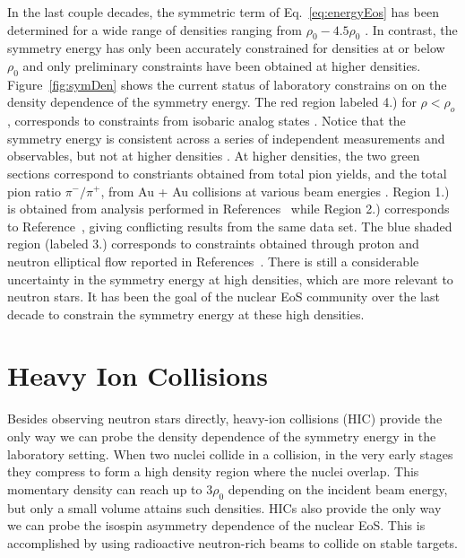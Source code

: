 In the last couple decades, the symmetric term of Eq.~\ref{eq:energyEos} has been determined for a wide range of densities ranging from $\rho_0 - 4.5\rho_0$ \cite{scienceEos}. In contrast, the symmetry energy has only been accurately constrained for densities at or below $\rho_0$ and only preliminary constraints have been obtained at higher densities. Figure~\ref{fig:symDen} shows the current status of laboratory constrains on on the density dependence of the symmetry energy. The red region labeled 4.) for $\rho < \rho_o$, corresponds to constraints from isobaric analog states \cite{dan2014}. Notice that the symmetry energy is consistent across  a series of independent measurements and observables, but not at higher densities \cite{awayforward}. At higher densities, the two green sections correspond to constriants obtained from total pion yields, and the total pion ratio $\pi^-/\pi^+$, from Au + Au collisions at various beam energies \cite{fopi}. Region 1.) is obtained from analysis performed in References~\cite{xia2009,xie2013} while Region 2.) corresponds to Reference~\cite{feng2010}, giving conflicting results from the same data set. The blue shaded region (labeled 3.) corresponds to constraints obtained through proton and neutron elliptical flow reported in References~\cite{russo2016,cozma2016,cozma2017}. There is still a considerable uncertainty in the symmetry energy at high densities, which are more relevant to neutron stars. It has been the goal of the nuclear EoS community over the last decade to constrain the symmetry energy at these high densities. 




\section{Heavy Ion Collisions}
Besides observing neutron stars directly, heavy-ion collisions (HIC) provide the only way we can probe the density dependence of the symmetry energy in the laboratory setting. When two nuclei collide in a collision, in the very early stages they compress to form a high density region where the nuclei overlap. This momentary density can reach up to $3\rho_0$ depending on the incident beam energy, but only a small volume attains such densities.  HICs also provide the only way we can probe the isospin asymmetry dependence of the nuclear EoS. This is accomplished by using radioactive neutron-rich beams to collide on stable targets. 

